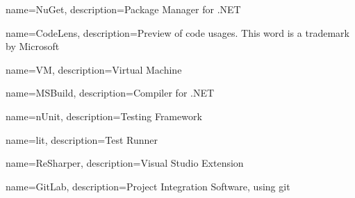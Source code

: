{
	name=NuGet,
	description={Package Manager for .NET}
}

{
	name=CodeLens,
	description={Preview of code usages. This word is a trademark by Microsoft}
}

{
	name=VM,
	description={Virtual Machine}
}

{
	name=MSBuild,
	description={Compiler for .NET}
}

{
	name=nUnit,
	description={Testing Framework}
}

{
	name=lit,
	description={Test Runner}
}

{
	name=ReSharper,
	description={Visual Studio Extension}
}

{
	name=GitLab,
	description={Project Integration Software, using git}
}
